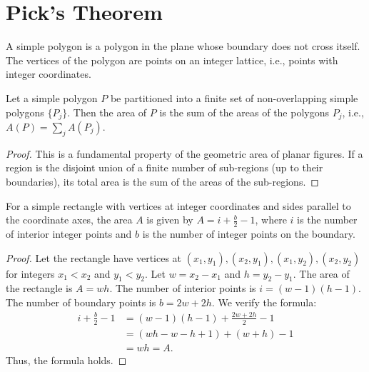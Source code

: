 \chapter{Pick's Theorem}

\begin{definition}
    \label{def:Simple_Polygon}
    A simple polygon is a polygon in the plane whose boundary does not cross itself. The vertices of the polygon are points on an integer lattice, i.e., points with integer coordinates.
\end{definition}

\begin{lemma}
    \label{lem:Additivity_of_Area}
    Let a simple polygon $P$ be partitioned into a finite set of non-overlapping simple polygons $\{P_j\}$. Then the area of $P$ is the sum of the areas of the polygons $P_j$, i.e., $A(P) = \sum_{j} A(P_j)$.
\end{lemma}

\begin{proof}
    This is a fundamental property of the geometric area of planar figures. If a region is the disjoint union of a finite number of sub-regions (up to their boundaries), its total area is the sum of the areas of the sub-regions.
\end{proof}

\begin{lemma}
    \label{lem:Area_of_a_Rectangle}
    For a simple rectangle with vertices at integer coordinates and sides parallel to the coordinate axes, the area $A$ is given by $A = i + \frac{b}{2} - 1$, where $i$ is the number of interior integer points and $b$ is the number of integer points on the boundary.
\end{lemma}

\begin{proof}
    Let the rectangle have vertices at $(x_1,y_1), (x_2,y_1), (x_1,y_2), (x_2,y_2)$ for integers $x_1<x_2$ and $y_1<y_2$. Let $w = x_2-x_1$ and $h=y_2-y_1$. The area of the rectangle is $A = wh$.
    The number of interior points is $i = (w-1)(h-1)$.
    The number of boundary points is $b = 2w + 2h$.
    We verify the formula:
    \begin{align*}
        i + \frac{b}{2} - 1 &= (w-1)(h-1) + \frac{2w+2h}{2} - 1 \\
        &= (wh - w - h + 1) + (w+h) - 1 \\
        &= wh = A.
    \end{align*}
    Thus, the formula holds.
\end{proof}

